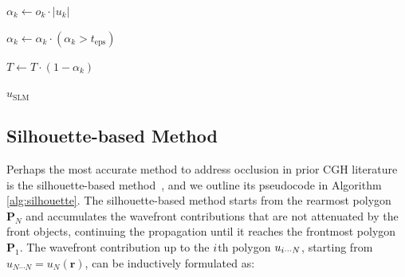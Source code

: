 \begin{algorithm*}[h]
{    $\alpha_k \gets o_k \cdot |u_k|$ 

    $\alpha_k \gets \alpha_k \cdot (\alpha_k > t_\text{eps})$ 


    $T \gets T \cdot (1 - \alpha_k)$ 
}
\Return $u_\text{SLM}$
\end{algorithm*}

\subsection{Silhouette-based Method}
\label{subsec:silhouette}
Perhaps the most accurate method to address occlusion in prior CGH literature is the silhouette-based method~\cite{matsushima2014silhouette}, and we outline its pseudocode in Algorithm \ref{alg:silhouette}. The silhouette-based method starts from the rearmost polygon $\mathbf{P}_N$ and accumulates the wavefront contributions that are not attenuated by the front objects, continuing the propagation until it reaches the frontmost polygon $\mathbf{P}_1$. The wavefront contribution up to the $i$th polygon $u_{i \cdots N}$, starting from $u_{N \cdots N} = u_N\left(\mathbf{r}\right)$, can be inductively formulated as:


